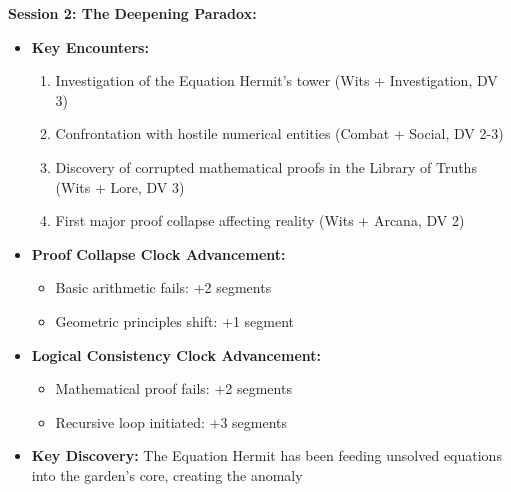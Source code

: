 \documentclass[11pt]{article}
\begin{document}
\textbf{Session 2: The Deepening Paradox:}
\begin{itemize}
    \item \textbf{Key Encounters:}
    \begin{enumerate}
        \item Investigation of the Equation Hermit's tower (Wits + Investigation, DV 3)
        \item Confrontation with hostile numerical entities (Combat + Social, DV 2-3)
        \item Discovery of corrupted mathematical proofs in the Library of Truths (Wits + Lore, DV 3)
        \item First major proof collapse affecting reality (Wits + Arcana, DV 2)
    \end{enumerate}
    \item \textbf{Proof Collapse Clock Advancement:}
    \begin{itemize}
        \item Basic arithmetic fails: +2 segments
        \item Geometric principles shift: +1 segment
    \end{itemize}
    \item \textbf{Logical Consistency Clock Advancement:}
    \begin{itemize}
        \item Mathematical proof fails: +2 segments
        \item Recursive loop initiated: +3 segments
    \end{itemize}
    \item \textbf{Key Discovery:} The Equation Hermit has been feeding unsolved equations into the garden's core, creating the anomaly
\end{itemize}
\end{document}
